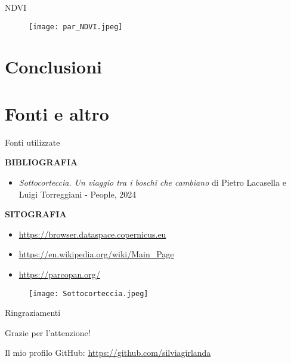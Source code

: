 \documentclass{beamer} %
\begin{document}
        
\begin{frame}{NDVI}

\begin{figure}
    \centering
    \texttt{[image: par\_NDVI.jpeg]}
\end{figure}
 \end{frame}

\section{Conclusioni}

\section{Fonti e altro}

 \begin{frame}{Fonti utilizzate}
 \begin{multicols}{2}
 \textbf{BIBLIOGRAFIA}
 \begin{itemize}
     \item \textit{Sottocorteccia. Un viaggio tra i boschi che cambiano} di 
Pietro Lacasella e Luigi Torreggiani - People, 2024
 \end{itemize}
\bigskip
 \textbf{SITOGRAFIA}
            \begin{itemize}
                \item \url{https://browser.dataspace.copernicus.eu} \\
                \item \url{https://en.wikipedia.org/wiki/Main_Page} \\
                \item \url{https://parcopan.org/} \\
            \end{itemize}  
\columnbreak
\begin{figure}
    \centering
    \texttt{[image: Sottocorteccia.jpeg]}
\end{figure}
\end{multicols}
        \end{frame}
        
\begin{frame}{Ringraziamenti}
            \begin{center}
                {\huge Grazie per l'attenzione!}\\
                \bigskip
                \bigskip
                \bigskip
                \bigskip
                \bigskip
                \bigskip
                \bigskip
                \bigskip
            \end{center}
        Il mio profilo GitHub: \url{https://github.com/silviagirlanda} \end{frame}
\end{document}

